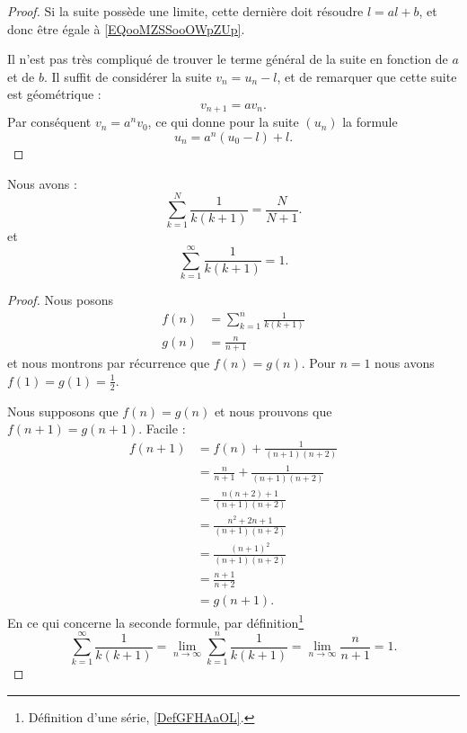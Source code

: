 \begin{proof}
	Si la suite possède une limite, cette dernière doit résoudre \( l=al+b\), et donc être égale à \eqref{EQooMZSSooOWpZUp}.

	Il n'est pas très compliqué de trouver le terme général de la suite en fonction de \( a\) et de \( b\). Il suffit de considérer la suite \( v_n=u_n-l\), et de remarquer que cette suite est géométrique :
	\begin{equation}
		v_{n+1}=av_n.
	\end{equation}
	Par conséquent \( v_n=a^nv_0\), ce qui donne pour la suite \( (u_n)\) la formule
	\begin{equation}
		u_n=a^n(u_0-l)+l.
	\end{equation}
\end{proof}

\begin{lemma}     \label{LEMooKDHPooPlFTIT}
	Nous avons :
	\begin{equation}
		\sum_{k=1}^N\frac{1}{ k(k+1) }=\frac{ N }{ N+1 }.
	\end{equation}
	et
	\begin{equation}
		\sum_{k=1}^{\infty}\frac{1}{ k(k+1) }=1.
	\end{equation}
\end{lemma}

\begin{proof}
	Nous posons
	\begin{subequations}
		\begin{align}
			f(n) & =\sum_{k=1}^n\frac{1}{ k(k+1) } \\
			g(n) & =\frac{ n }{ n+1 }
		\end{align}
	\end{subequations}
	et nous montrons par récurrence que \( f(n)=g(n)\). Pour \( n=1\) nous avons \( f(1)=g(1)=\frac{ 1 }{2}\).

	Nous supposons que \( f(n)=g(n)\) et nous prouvons que \( f(n+1)=g(n+1)\). Facile :
	\begin{subequations}
		\begin{align}
			f(n+1) & =f(n)+\frac{1}{ (n+1)(n+2) }              \\
			       & =\frac{ n }{ n+1 }+\frac{1}{ (n+1)(n+2) } \\
			       & =\frac{ n(n+2)+1 }{ (n+1)(n+2) }          \\
			       & =\frac{ n^2+2n+1 }{ (n+1)(n+2) }          \\
			       & =\frac{ (n+1)^2 }{ (n+1)(n+2) }           \\
			       & =\frac{ n+1 }{ n+2 }                      \\
			       & =g(n+1).
		\end{align}
	\end{subequations}
	En ce qui concerne la seconde formule, par définition\footnote{Définition d'une série, \ref{DefGFHAaOL}.}
	\begin{equation}
		\sum_{k=1}^{\infty}\frac{1}{ k(k+1) }=\lim_{n\to \infty} \sum_{k=1}^n\frac{1}{ k(k+1) }=\lim_{n\to \infty}\frac{ n }{ n+1 } =1.
	\end{equation}
\end{proof}

